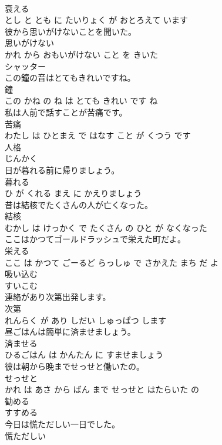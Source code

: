 \documentclass[8pt]{extreport}
\begin{document}
\begin{CJK}{UTF8}{min}
\\	衰える 
\\	とし と とも に たいりょく が おとろえて います			
\\	彼から思いがけないことを聞いた。	
\\	思いがけない 
\\	かれ から おもいがけない こと を きいた			
\\	シャッター	
\\	この鐘の音はとてもきれいですね。	
\\	鐘 
\\	この かね の ね は とても きれい です ね			
\\	私は人前で話すことが苦痛です。	
\\	苦痛 
\\	わたし は ひとまえ で はなす こと が くつう です			
\\	人格	
\\	じんかく			
\\	日が暮れる前に帰りましょう。	
\\	暮れる 
\\	ひ が くれる まえ に かえりましょう			
\\	昔は結核でたくさんの人が亡くなった。	
\\	結核 
\\	むかし は けっかく で たくさん の ひと が なくなった			
\\	ここはかつてゴールドラッシュで栄えた町だよ。	
\\	栄える 
\\	ここ は かつて ごーるど らっしゅ で さかえた まち だ よ			
\\	吸い込む	
\\	すいこむ			
\\	連絡があり次第出発します。	
\\	次第 
\\	れんらく が あり しだい しゅっぱつ します			
\\	昼ごはんは簡単に済ませましょう。	
\\	済ませる 
\\	ひるごはん は かんたん に すませましょう			
\\	彼は朝から晩までせっせと働いたの。	
\\	せっせと 
\\	かれ は あさ から ばん まで せっせと はたらいた の			
\\	勧める	
\\	すすめる			
\\	今日は慌ただしい一日でした。	
\\	慌ただしい 

\end{CJK}
\end{document}
